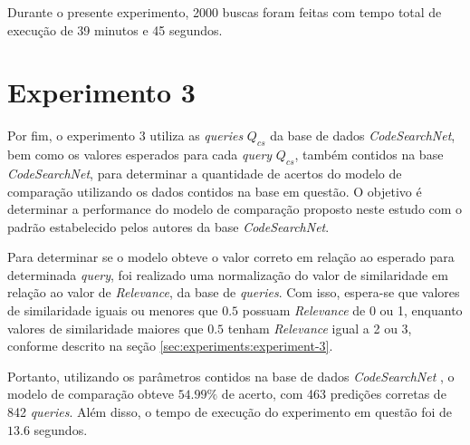 Durante o presente experimento, 2000 buscas foram feitas com tempo total de execução de 39 minutos e 45 segundos.

\section{Experimento 3} 
\label{sec:results:experiment-3}
Por fim, o experimento 3 utiliza as \textit{queries} $Q_{cs}$ da base de dados \textit{CodeSearchNet}, bem como os valores esperados para cada \textit{query} $Q_{cs}$, também contidos na base \textit{CodeSearchNet}, para determinar a quantidade de acertos do modelo de comparação utilizando os dados contidos na base em questão. O objetivo é determinar a performance do modelo de comparação proposto neste estudo com o padrão estabelecido pelos autores da base \textit{CodeSearchNet}.

Para determinar se o modelo obteve o valor correto em relação ao esperado para determinada \textit{query}, foi realizado uma normalização do valor de similaridade em relação ao valor de \textit{Relevance}, da base de \textit{queries}. Com isso, espera-se que valores de similaridade iguais ou menores que $0.5$ possuam \textit{Relevance} de 0 ou 1, enquanto valores de similaridade maiores que $0.5$ tenham \textit{Relevance} igual a 2 ou 3, conforme descrito na seção \ref{sec:experiments:experiment-3}.

Portanto, utilizando os parâmetros contidos na base de dados \textit{CodeSearchNet} \cite{Husain2019CodeSearchNetCE}, o modelo de comparação obteve $54.99\%$ de acerto, com 463 predições corretas de 842 \textit{queries}. Além disso, o tempo de execução do experimento em questão foi de $13.6$ segundos.
